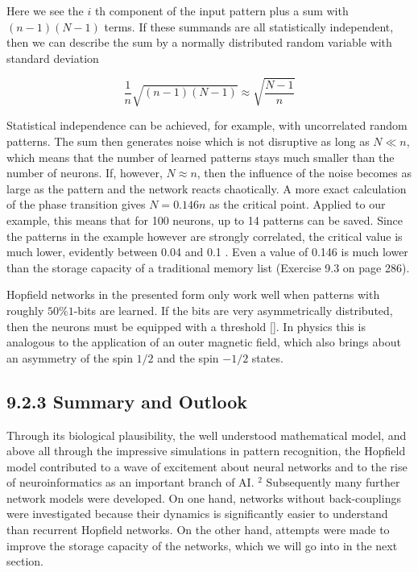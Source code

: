 \documentclass[10pt]{article}
\begin{document}
Here we see the $i$ th component of the input pattern plus a sum with $(n-1)(N-1)$ terms. If these summands are all statistically independent, then we can describe the sum by a normally distributed random variable with standard deviation


$$
\frac{1}{n} \sqrt{(n-1)(N-1)} \approx \sqrt{\frac{N-1}{n}}
$$

Statistical independence can be achieved, for example, with uncorrelated random patterns. The sum then generates noise which is not disruptive as long as $N \ll n$, which means that the number of learned patterns stays much smaller than the number of neurons. If, however, $N \approx n$, then the influence of the noise becomes as large as the pattern and the network reacts chaotically. A more exact calculation of the phase transition gives $N=0.146 n$ as the critical point. Applied to our example, this means that for 100 neurons, up to 14 patterns can be saved. Since the patterns in the example however are strongly correlated, the critical value is much lower, evidently between 0.04 and 0.1 . Even a value of 0.146 is much lower than the storage capacity of a traditional memory list (Exercise 9.3 on page 286).

Hopfield networks in the presented form only work well when patterns with roughly $50 \% 1$-bits are learned. If the bits are very asymmetrically distributed, then the neurons must be equipped with a threshold [\cite{rojas1996neural}]. In physics this is analogous to the application of an outer magnetic field, which also brings about an asymmetry of the spin $1 / 2$ and the spin $-1 / 2$ states.

\subsection*{9.2.3 Summary and Outlook}
Through its biological plausibility, the well understood mathematical model, and above all through the impressive simulations in pattern recognition, the Hopfield model contributed to a wave of excitement about neural networks and to the rise of neuroinformatics as an important branch of AI. ${ }^{2}$ Subsequently many further network models were developed. On one hand, networks without back-couplings were investigated because their dynamics is significantly easier to understand than recurrent Hopfield networks. On the other hand, attempts were made to improve the storage capacity of the networks, which we will go into in the next section.
\end{document}
